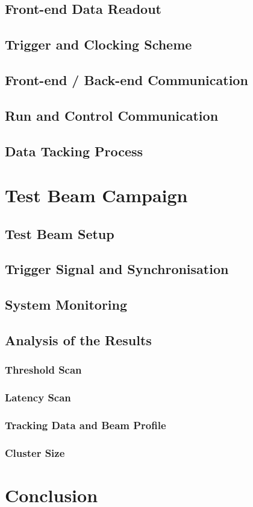         \subsection{Front-end Data Readout}

        \subsection{Trigger and Clocking Scheme}

        \subsection{Front-end / Back-end Communication}

        \subsection{Run and Control Communication}

        \subsection{Data Tacking Process}

    \section{Test Beam Campaign}

        \subsection{Test Beam Setup}

        \subsection{Trigger Signal and Synchronisation}

        \subsection{System Monitoring}

        \subsection{Analysis of the Results}

            \subsubsection{Threshold Scan}

            \subsubsection{Latency Scan}

            \subsubsection{Tracking Data and Beam Profile}

            \subsubsection{Cluster Size}

    \section{Conclusion}
